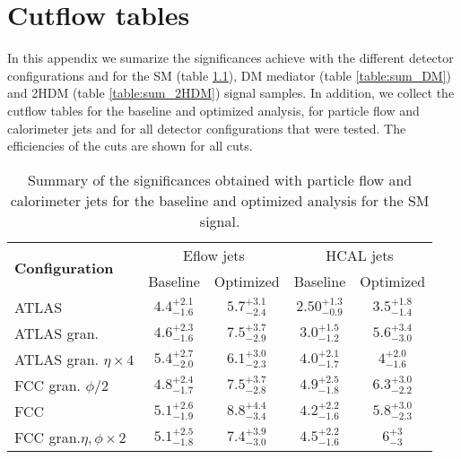
\chapter{Cutflow tables}
\label{chapter:cutflows}
In this appendix we sumarize the significances achieve with the different detector configurations and for the SM (table \ref{table:sum_SM}), DM mediator (table \ref{table:sum_DM}) and 2HDM (table \ref{table:sum_2HDM}) signal samples. In addition, we collect the cutflow tables for the baseline and optimized analysis, for particle flow and calorimeter jets and for all detector configurations that were tested. The efficiencies of the cuts are shown for all cuts.
 
\begin{table}[h]
	\caption{Summary of the significances obtained with particle flow and calorimeter jets for the baseline and optimized analysis for the SM signal.}
	\label{table:sum_SM}
	\centering
	\begin{tabular}{lcccc}
		\hline
		 \multirow{2}{*}{\textbf{Configuration}} & \multicolumn{2}{c}{Eflow jets}    & \multicolumn{2}{c}{HCAL jets} \\ \cline{2-5} 
		& Baseline & Optimized & Baseline  & Optimized           \\ \midrule \midrule
		ATLAS& $4.4^{+2.1}_{-1.6}$ & $5.7^{+3.1}_{-2.4}$ & $2.50^{+1.3}_{-0.9}$ & $3.5^{+1.8}_{-1.4}$\\ 
		\rowcolor{black!7}ATLAS gran.& $4.6^{+2.3}_{-1.6}$ & $7.5^{+3.7}_{-2.9}$ & $3.0^{+1.5}_{-1.2}$ & $5.6^{+3.4}_{-3.0}$ \\ 
		ATLAS gran. $\eta\times 4$& $5.4^{+2.7}_{-2.0}$ & $6.1^{+3.0}_{-2.3}$ & $4.0^{+2.1}_{-1.7}$ & $4^{+2.0}_{-1.6}$ \\ 
		\rowcolor{black!7}FCC gran. $\phi/2$& $4.8^{+2.4}_{-1.7}$ & $7.5^{+3.7}_{-2.8}$ & $4.9^{+2.5}_{-1.8}$ & $6.3^{+3.0}_{-2.2}$\\ 
		FCC& $5.1^{+2.6}_{-1.9}$ & $8.8^{+4.4}_{-3.4}$ & $4.2^{+2.2}_{-1.6}$ & $5.8^{+3.0}_{-2.3}$ \\ 
		\rowcolor{black!7}FCC gran.$\eta,\phi \times 2$& $5.1^{+2.5}_{-1.8}$ & $7.4^{+3.9}_{-3.0}$ &  $4.5^{+2.2}_{-1.6}$& $6^{+3}_{-3}$ \\ \bottomrule
	\end{tabular}
	
\end{table}

